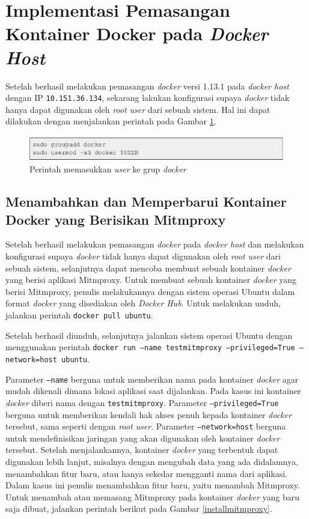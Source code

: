 \section{Implementasi Pemasangan Kontainer Docker pada \textit{Docker Host}}
Setelah berhasil melakukan pemasangan \textit{docker} versi 1.13.1 pada \textit{docker host} dengan IP \texttt{10.151.36.134}, sekarang lakukan konfigurasi supaya \textit{docker} tidak hanya dapat digunakan oleh \textit{root user} dari sebuah sistem. Hal ini dapat dilakukan dengan menjalankan perintah pada Gambar \ref{konfigurasildocker1}.
\begin{figure}[H]
	\centering
	\includegraphics[width=\linewidth]{images/bab4/konfigurasildocker1}
	\caption{Perintah memasukkan \textit{user} ke grup \textit{docker}}
	\label{konfigurasildocker1}
\end{figure}


\subsection{Menambahkan dan Memperbarui Kontainer Docker yang Berisikan Mitmproxy}
Setelah berhasil melakukan pemasangan \textit{docker} pada \textit{docker host} dan melakukan konfigurasi supaya \textit{docker} tidak hanya dapat digunakan oleh \textit{root user} dari sebuah sistem, selanjutnya dapat mencoba membuat sebuah kontainer \textit{docker} yang berisi aplikasi Mitmproxy. Untuk membuat sebuah kontainer \textit{docker} yang berisi Mitmproxy, penulis melakukannya dengan sistem operasi Ubuntu dalam format \textit{docker} yang disediakan oleh \textit{Docker Hub}. Untuk melakukan unduh, jalankan perintah \texttt{docker pull ubuntu}.

Setelah berhasil diunduh, selanjutnya jalankan sistem operasi Ubuntu dengan menggunakan perintah \texttt{docker run --name testmitmproxy --privileged=True --network=host ubuntu}.

Parameter \texttt{--name} berguna untuk memberikan nama pada kontainer \textit{docker} agar mudah dikenali dimana lokasi aplikasi saat dijalankan. Pada kasus ini kontainer \textit{docker} diberi nama dengan \texttt{testmitmproxy}. Parameter \texttt{--privileged=True} berguna untuk memberikan kendali hak akses penuh kepada kontainer \textit{docker} tersebut, sama seperti dengan \textit{root user}. Parameter \texttt{--network=host} berguna untuk mendefinisikan jaringan yang akan digunakan oleh kontainer \textit{docker} tersebut. Setelah menjalankannya, kontainer \textit{docker} yang terbentuk dapat digunakan lebih lanjut, misalnya dengan mengubah data yang ada didalamnya, menambahkan fitur baru, atau hanya sekedar mengganti nama dari aplikasi.\\
\indent Dalam kasus ini penulis menambahkan fitur baru, yaitu menambah Mitmproxy. Untuk menambah atau memasang Mitmproxy pada kontainer \textit{docker} yang baru saja dibuat, jalankan perintah berikut pada Gambar \ref{installmitmproxy}.

